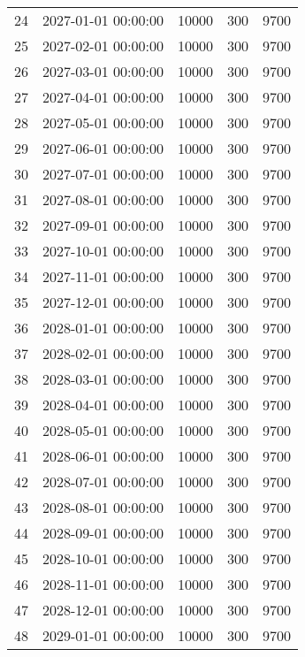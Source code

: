 \begin{longtable}{llrrr}
24 & 2027-01-01 00:00:00 & 10000 & 300 & 9700 \\
25 & 2027-02-01 00:00:00 & 10000 & 300 & 9700 \\
26 & 2027-03-01 00:00:00 & 10000 & 300 & 9700 \\
27 & 2027-04-01 00:00:00 & 10000 & 300 & 9700 \\
28 & 2027-05-01 00:00:00 & 10000 & 300 & 9700 \\
29 & 2027-06-01 00:00:00 & 10000 & 300 & 9700 \\
30 & 2027-07-01 00:00:00 & 10000 & 300 & 9700 \\
31 & 2027-08-01 00:00:00 & 10000 & 300 & 9700 \\
32 & 2027-09-01 00:00:00 & 10000 & 300 & 9700 \\
33 & 2027-10-01 00:00:00 & 10000 & 300 & 9700 \\
34 & 2027-11-01 00:00:00 & 10000 & 300 & 9700 \\
35 & 2027-12-01 00:00:00 & 10000 & 300 & 9700 \\
36 & 2028-01-01 00:00:00 & 10000 & 300 & 9700 \\
37 & 2028-02-01 00:00:00 & 10000 & 300 & 9700 \\
38 & 2028-03-01 00:00:00 & 10000 & 300 & 9700 \\
39 & 2028-04-01 00:00:00 & 10000 & 300 & 9700 \\
40 & 2028-05-01 00:00:00 & 10000 & 300 & 9700 \\
41 & 2028-06-01 00:00:00 & 10000 & 300 & 9700 \\
42 & 2028-07-01 00:00:00 & 10000 & 300 & 9700 \\
43 & 2028-08-01 00:00:00 & 10000 & 300 & 9700 \\
44 & 2028-09-01 00:00:00 & 10000 & 300 & 9700 \\
45 & 2028-10-01 00:00:00 & 10000 & 300 & 9700 \\
46 & 2028-11-01 00:00:00 & 10000 & 300 & 9700 \\
47 & 2028-12-01 00:00:00 & 10000 & 300 & 9700 \\
48 & 2029-01-01 00:00:00 & 10000 & 300 & 9700 \\
\end{longtable}